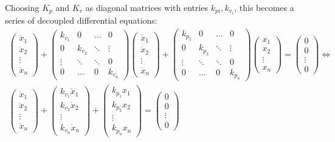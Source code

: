 Choosing $K_{p}$ and $K_{v}$ as diagonal matrices with entries $k_{p i}, k_{v_{i}}$, this becomes a series of decoupled differential equations:
$$
\begin{gathered}
\left(\begin{array}{c}
\ddot{x}_{1} \\
\ddot{x}_{2} \\
\vdots \\
\ddot{x}_{n}
\end{array}\right)+\left(\begin{array}{cccc}
k_{v_{1}} & 0 & \ldots & 0 \\
0 & k_{v_{2}} & \ddots & \vdots \\
\vdots & \ddots & \ddots & 0 \\
0 & \ldots & 0 & k_{v_{n}}
\end{array}\right)\left(\begin{array}{c}
\dot{x}_{1} \\
\dot{x}_{2} \\
\vdots \\
\dot{x}_{n}
\end{array}\right)+\left(\begin{array}{cccc}
k_{p_{1}} & 0 & \ldots & 0 \\
0 & k_{p_{2}} & \ddots & \vdots \\
\vdots & \ddots & \ddots & 0 \\
0 & \ldots & 0 & k_{p_{n}}
\end{array}\right)\left(\begin{array}{c}
x_{1} \\
x_{2} \\
\vdots \\
x_{n}
\end{array}\right)=\left(\begin{array}{c}
0 \\
0 \\
\vdots \\
0
\end{array}\right) \Leftrightarrow \\
\left(\begin{array}{c}
\ddot{x}_{1} \\
\ddot{x}_{2} \\
\vdots \\
\ddot{x}_{n}
\end{array}\right)+\left(\begin{array}{c}
k_{v_{1}} \dot{x}_{1} \\
k_{v_{2}} \dot{x}_{2} \\
\vdots \\
k_{v_{n}} \dot{x}_{n}
\end{array}\right)+\left(\begin{array}{c}
k_{p_{1}} x_{1} \\
k_{p_{2}} x_{2} \\
\vdots \\
k_{p_{n}} x_{n}
\end{array}\right)=\left(\begin{array}{c}
0 \\
0 \\
\vdots \\
0
\end{array}\right)
\end{gathered}
$$
